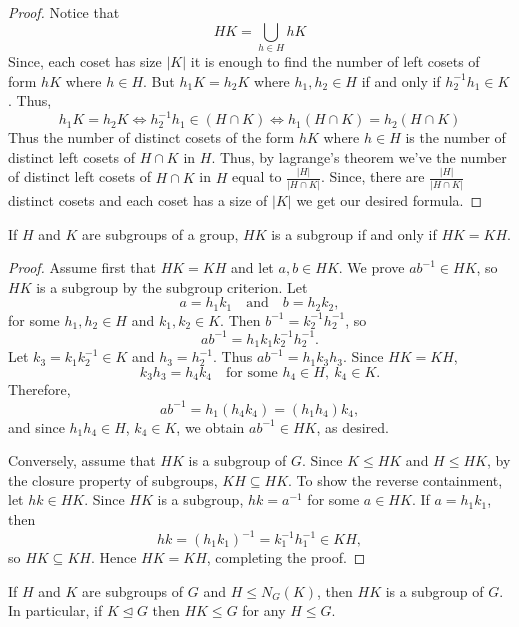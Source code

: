 \begin{proof}
    Notice that 
    \[ HK = \bigcup_{h \in H} hK \]
    Since, each coset has size $|K|$ it is enough to find the number of left cosets of form $hK$ where $h \in H$. But $h_1 K = h_2 K$ where
    $h_1,h_2 \in H$ if and only if $h_2^{-1}h_1 \in K$. Thus,
    \[ h_1 K = h_2 K \iff h_2^{-1}h_1 \in (H \cap K) \iff h_1 (H \cap K) = h_2 (H \cap K) \]
    Thus the number of distinct cosets of the form $hK$ where $h \in H$ is the number of distinct left cosets of $H \cap K$ in $H$.
    Thus, by lagrange's theorem we've the number of distinct left cosets of $H \cap K$ in $H$ equal to $\frac{|H|}{|H\cap K|}$.
    Since, there are $\frac{|H|}{|H\cap K|}$ distinct cosets and each coset has a size of $|K|$ we get our desired formula.
\end{proof}

\begin{proposition}
    If $H$ and $K$ are subgroups of a group, $HK$ is a subgroup if and only if $HK=KH$.
\end{proposition}

\begin{proof}
Assume first that \( HK = KH \) and let \( a, b \in HK \). We prove \( ab^{-1} \in HK \), so \( HK \) is a subgroup by the subgroup criterion.
Let
\[
a = h_1 k_1 \quad \text{and} \quad b = h_2 k_2,
\]
for some \( h_1, h_2 \in H \) and \( k_1, k_2 \in K \). Then \( b^{-1} = k_2^{-1} h_2^{-1} \), so 
\[
ab^{-1} = h_1 k_1 k_2^{-1} h_2^{-1}.
\]
Let \( k_3 = k_1 k_2^{-1} \in K \) and \( h_3 = h_2^{-1} \). Thus \( ab^{-1} = h_1 k_3 h_3 \). Since \( HK = KH \),
\[
k_3 h_3 = h_4 k_4 \quad \text{for some } h_4 \in H, \ k_4 \in K.
\]
Therefore,
\[
ab^{-1} = h_1 (h_4 k_4) = (h_1 h_4) k_4,
\]
and since \( h_1 h_4 \in H \), \( k_4 \in K \), we obtain \( ab^{-1} \in HK \), as desired.

Conversely, assume that \( HK \) is a subgroup of \( G \). Since \( K \leq HK \) and \( H \leq HK \), by the closure property of subgroups,
 \( KH \subseteq HK \). To show the reverse containment, let \( hk \in HK \). Since \( HK \) is a subgroup, \( hk = a^{-1} \) for some
  \( a \in HK \). If \( a = h_1 k_1 \), then
\[
hk = (h_1 k_1)^{-1} = k_1^{-1} h_1^{-1} \in KH,
\]
so \( HK \subseteq KH \). Hence \( HK = KH \), completing the proof.
    
\end{proof}

\begin{proposition}
    If \( H \) and \( K \) are subgroups of \( G \) and \( H \leq N_G(K) \), then \( HK \) is a subgroup of \( G \). 
    In particular, if \( K \trianglelefteq G \) then \( HK \leq G \) for any \( H \leq G \).
\end{proposition}

